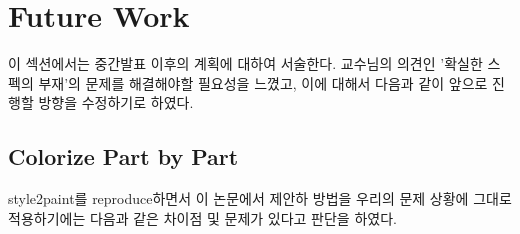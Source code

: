 \section{Future Work}

이 섹션에서는 중간발표 이후의 계획에 대하여 서술한다.
교수님의 의견인 '확실한 스펙의 부재'의 문제를 해결해야할 필요성을 느꼈고, 이에 대해서 다음과 같이 앞으로 진행할 방향을 수정하기로 하였다.

\subsection{Colorize Part by Part}

style2paint를 reproduce하면서 이 논문에서 제안하 방법을 우리의 문제 상황에 그대로 적용하기에는 다음과 같은 차이점 및 문제가 있다고 판단을 하였다.